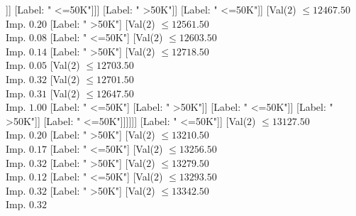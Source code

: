 \documentclass[margin=10pt]{standalone}
\begin{document}
\begin{forest}
																										[Val($2$) $ \leq 12293.50$ \\ Imp. $0.03$
																											[Val($2$) $ \leq 12103.50$ \\ Imp. $0.01$
																												[Label: " <=50K"]
																												[Val($2$) $ \leq 12140.50$ \\ Imp. $0.20$
																													[Label: " >50K"]
																													[Label: " <=50K"]]]
																											[Label: " <=50K"]]]
																									[Label: " >50K"]]
																								[Label: " <=50K"]]
																							[Val($2$) $ \leq 12467.50$ \\ Imp. $0.20$
																								[Label: " >50K"]
																								[Val($2$) $ \leq 12561.50$ \\ Imp. $0.08$
																									[Label: " <=50K"]
																									[Val($2$) $ \leq 12603.50$ \\ Imp. $0.14$
																										[Label: " >50K"]
																										[Val($2$) $ \leq 12718.50$ \\ Imp. $0.05$
																											[Val($2$) $ \leq 12703.50$ \\ Imp. $0.32$
																												[Val($2$) $ \leq 12701.50$ \\ Imp. $0.31$
																													[Val($2$) $ \leq 12647.50$ \\ Imp. $1.00$
																														[Label: " <=50K"]
																														[Label: " >50K"]]
																													[Label: " <=50K"]]
																												[Label: " >50K"]]
																											[Label: " <=50K"]]]]]]
																						[Label: " <=50K"]]
																					[Val($2$) $ \leq 13127.50$ \\ Imp. $0.20$
																						[Label: " >50K"]
																						[Val($2$) $ \leq 13210.50$ \\ Imp. $0.17$
																							[Label: " <=50K"]
																							[Val($2$) $ \leq 13256.50$ \\ Imp. $0.32$
																								[Label: " >50K"]
																								[Val($2$) $ \leq 13279.50$ \\ Imp. $0.12$
																									[Label: " <=50K"]
																									[Val($2$) $ \leq 13293.50$ \\ Imp. $0.32$
																										[Label: " >50K"]
																										[Val($2$) $ \leq 13342.50$ \\ Imp. $0.32$

\end{forest}
\end{document}
